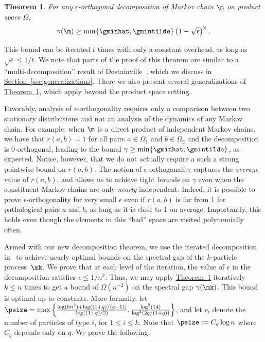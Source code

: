 \documentclass[11pt]{article}
\newtheorem{theorem}{Theorem}[section]
\providecommand{\expref}[2]{\texorpdfstring{\hyperref[#2]{#1~\ref{#2}}}{#1~\ref{#2}}}
\begin{document}
\begin{theorem}\label{thm:productspaces}
For any $\epsilon$-orthogonal decomposition of Markov chain $\m$ on 
product space $\Omega$,
\[ \gamma(\m) \geq \min\{\gminhat, \gmintilde\}\left(1 -\sqrt{\epsilon}\right)^2\,.\]
\end{theorem}

\noindent This bound can be iterated $t$ times with 
only a constant overhead, as long as $\sqrt{\epsilon}\leq 1/t$.
We note that parts of the proof of this theorem are similar
to a ``multi-decomposition'' result of Destainville~\cite{Dest03},
which we discuss in \expref{Section}{sec:generalizations}.  There we also
present several generalizations of \expref{Theorem}{thm:productspaces}, 
which apply beyond the product space setting.

Favorably, analysis of $\epsilon$-orthogonality requires only a 
comparison between two stationary distributions and not an analysis of 
the dynamics of any Markov chain.  For example, when $\m$ is a direct 
product of independent Markov chains, we have that $r(a,b)=1$ for all 
pairs $a\in\Omega_1$ and $b\in\Omega_2$ and the decomposition is 
$0$-orthogonal, leading to the bound $\gamma\geq 
\min\{\gminhat,\gmintilde\}$, as expected.  Notice, however, that we do 
not actually require a such a strong pointwise bound on $r(a,b)$.  The 
notion of $\epsilon$-orthogonality captures the \emph{average} value of 
$r(a,b)$, and allows us to achieve tight bounds on $\gamma$ even when 
the constituent Markov chains are only \emph{nearly} independent.  
Indeed, it is possible to prove %
$\epsilon$-orthogonality for very small $\epsilon$ %
even if 
$r(a,b)$ is far from 1 for pathological pairs $a$ and $b$, as long as 
it is close to 1 on average. Importantly, this holds even though the 
elements in this ``bad'' space are visited polynomially often.  

Armed with our new decomposition theorem, we use the iterated 
decomposition in~\cite{MS} to achieve nearly optimal bounds on the 
spectral gap of the $k$-particle process~$\mk$. We prove that at each
level of the iteration, %
the value of $\epsilon$ in the decomposition satisfies $\epsilon\leq 1/n^2$. %
%
Thus, we may apply \expref{Theorem}{thm:productspaces} iteratively $k\leq 
n$ times to get a bound of $\Omega(n^{-2})$ on the spectral gap 
$\gamma(\mk)$.  This bound is optimal up to constants. More formally, 
let $\psize = \max\left\{\frac{\log 
(6n^2)+\log((1+q)/(q-1))}{\log((1+q)/2)},  
\frac{\log^2(14)}{\log^2(2q/(1+q))}\right\}$, %
and let 
$c_i$ denote the number of particles of type $i$, for $1\leq i\leq k$.  
Note that $\psize := C_q \log n$  where $C_q$ depends only on $q.$
We prove the following.
\end{document}
